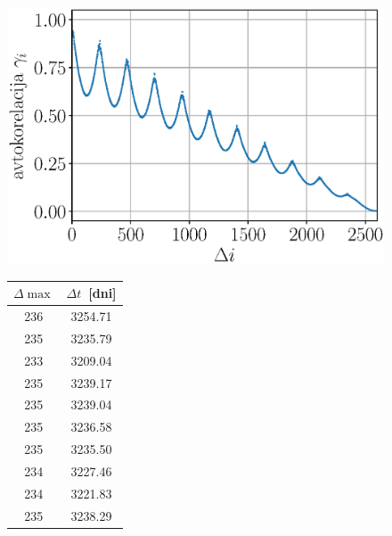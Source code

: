 \documentclass[a4paper,12pt]{article}
\begin{document}
\begin{figure}[h]
    \centering
    \begin{minipage}[t]{.66\textwidth}\vspace{1pt}%
        \centering
        \includegraphics[scale=0.6]{slikep/apsidal-angle-acorr.eps}
        \label{fig:apsidal-acorr}
    \end{minipage}%
    \qquad
    \begin{minipage}[t]{.27\textwidth}\vspace{7.7pt}%
        \begin{center}
            \begin{tabular}{c c}
                \toprule
                $\Delta \max$ & $\Delta t$\ [dni] \\
                \midrule[0.03em]
                236 & 3254.71 \\
                235 & 3235.79 \\
                233 & 3209.04 \\
                235 & 3239.17 \\
                235 & 3239.04 \\
                235 & 3236.58 \\
                235 & 3235.50 \\
                234 & 3227.46 \\
                234 & 3221.83 \\
                235 & 3238.29 \\
                \bottomrule
            \end{tabular}
        \end{center}
    \end{minipage}
\end{figure}
\end{document}
